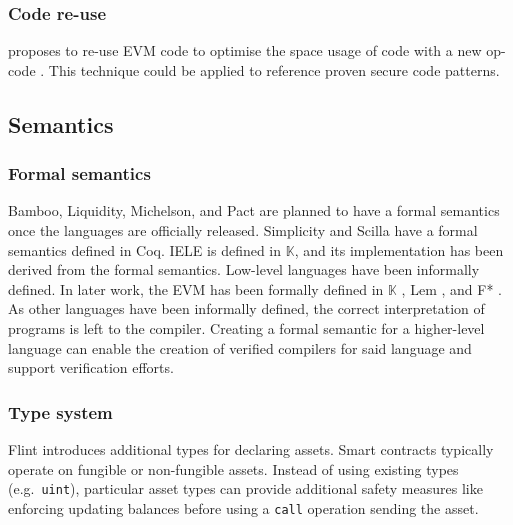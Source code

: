 

\subsubsection{Code re-use}
\citeauthor{Pontiveros2018} proposes to re-use EVM code to optimise the space usage of code with a new op-code \cite{Pontiveros2018}. This technique could be applied to reference proven secure code patterns.

\subsection{Semantics}

\subsubsection{Formal semantics}
Bamboo, Liquidity, Michelson, and Pact are planned to have a formal semantics once the languages are officially released.  Simplicity and Scilla have a formal semantics defined in Coq. IELE is defined in $\mathbb{K}$, and its implementation has been derived from the formal semantics.
Low-level languages have been informally defined. In later work, the EVM has been formally defined in $\mathbb{K}$ \cite{Hildenbrandt2017}, Lem \cite{Hirai2017}, and F* \cite{Grishchenko2018}.
As other languages have been informally defined, the correct interpretation of programs is left to the compiler. Creating a formal semantic for a higher-level language can enable the creation of verified compilers for said language and support verification efforts.

\subsubsection{Type system}
Flint introduces additional types for declaring assets. Smart contracts typically operate on fungible or non-fungible assets. Instead of using existing types (e.g.\ \texttt{uint}), particular asset types can provide additional safety measures like enforcing updating balances before using a \texttt{call} operation sending the asset.


